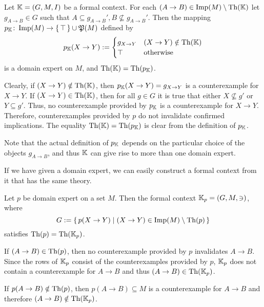 \begin{Proposition}
  \label{prop:domain-expert-from-domain}
  Let ${\mathbb{K}} = (G, M, I)$ be a formal context.  For each $(A \to B) \in \operatorname{Imp}(M) \setminus
  \operatorname{Th}({\mathbb{K}})$ let $g_{A \to B} \in G$ such that $A \subseteq g_{A \to B}', B
  \not\subseteq g_{A \to B}'$.  Then the mapping $p_{{\mathbb{K}}} \colon \operatorname{Imp}(M) \to {\ensuremath{\{\, \top \,\}}} \cup
  {\ensuremath{\mathfrak{P}(M)}}$ defined by
  \begin{equation*}
    p_{{\mathbb{K}}}(X \to Y) :=
    \begin{cases}
      g_{X \to Y} & (X \to Y) \notin \operatorname{Th}({\mathbb{K}}) \\
      \top & \text{otherwise}
    \end{cases}
  \end{equation*}
  is a domain expert on $M$, and $\operatorname{Th}({\mathbb{K}}) = \operatorname{Th}(p_{{\mathbb{K}}})$.
\end{Proposition}
\begin{Proof}
  Clearly, if $(X \to Y) \notin \operatorname{Th}({\mathbb{K}})$, then $p_{{\mathbb{K}}}(X \to Y) = g_{X \to Y}$ is
  a counterexample for $X \to Y$.  If $(X \to Y) \in \operatorname{Th}({\mathbb{K}})$, then for all $g \in G$
  it is true that either $X \not\subseteq g'$ or $Y \subseteq g'$.  Thus, no
  counterexample provided by $p_{{\mathbb{K}}}$ is a counterexample for $X \to Y$.  Therefore,
  counterexamples provided by $p$ do not invalidate confirmed implications.  The equality
  $\operatorname{Th}({\mathbb{K}}) = \operatorname{Th}(p_{{\mathbb{K}}})$ is clear from the definition of $p_{{\mathbb{K}}}$.
\end{Proof}

Note that the actual definition of $p_{{\mathbb{K}}}$ depends on the particular choice of the
objects $g_{A \to B}$, and thus ${\mathbb{K}}$ can give rise to more than one domain expert.

If we have given a domain expert, we can easily construct a formal context from it that
has the same theory.

\begin{Proposition}
  \label{prop:domain-from-domain-expert}
  Let $p$ be domain expert on a set $M$.  Then the formal context ${\mathbb{K}}_p = (G, M, \ni)$,
  where
  \begin{equation*}
    G := {\{\, p(X \to Y) \mid (X \to Y) \in \operatorname{Imp}(M) \setminus \operatorname{Th}(p) \,\}}
  \end{equation*}
  satisfies $\operatorname{Th}(p) = \operatorname{Th}({\mathbb{K}}_p)$.
\end{Proposition}
\begin{Proof}
  If $(A \to B) \in \operatorname{Th}(p)$, then no counterexample provided by $p$ invalidates $A \to
  B$.  Since the rows of ${\mathbb{K}}_p$ consist of the counterexamples provided by $p$, ${\mathbb{K}}_p$ does not contain a counterexample for $A \to B$ and thus $(A \to B) \in \operatorname{Th}({\mathbb{K}}_p)$.

  If $p(A \to B) \notin \operatorname{Th}(p)$, then $p(A \to B) \subseteq M$ is a counterexample for $A
  \to B$ and therefore $(A \to B) \notin \operatorname{Th}({\mathbb{K}}_p)$.
\end{Proof}


